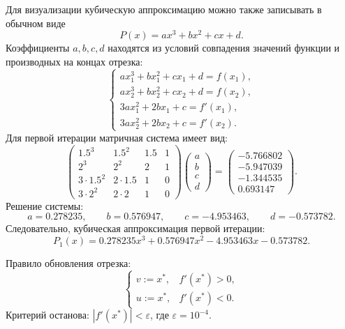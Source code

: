 \documentclass[12pt,a4paper]{article}
\begin{document}
Для визуализации кубическую аппроксимацию можно также записывать в обычном виде
\begin{equation}
  P(x)=ax^3+bx^2+cx+d.
\end{equation}
Коэффициенты $a,b,c,d$ находятся из условий совпадения значений функции и производных на концах отрезка:
\begin{equation}
\begin{cases}
  ax_1^3+bx_1^2+cx_1+d=f(x_1),\\
  ax_2^3+bx_2^2+cx_2+d=f(x_2),\\
  3ax_1^2+2bx_1+c=f'(x_1),\\
  3ax_2^2+2bx_2+c=f'(x_2).
\end{cases}
\end{equation}
Для первой итерации матричная система имеет вид:
\begin{equation}
\begin{pmatrix}
1.5^3 & 1.5^2 & 1.5 & 1\\
2^3 & 2^2 & 2 & 1\\
3\cdot 1.5^2 & 2\cdot 1.5 & 1 & 0\\
3\cdot 2^2 & 2\cdot 2 & 1 & 0
\end{pmatrix}
\begin{pmatrix}
a\\b\\c\\d
\end{pmatrix}
=
\begin{pmatrix}
-5.766802\\
-5.947039\\
-1.344535\\
0.693147
\end{pmatrix}.
\end{equation}
Решение системы:
\begin{equation}
  a=0.278235,\qquad b=0.576947,\qquad c=-4.953463,\qquad d=-0.573782.
\end{equation}
Следовательно, кубическая аппроксимация первой итерации:
\begin{equation}
  P_1(x)=0.278235x^3+0.576947x^2-4.953463x-0.573782.
\end{equation}

Правило обновления отрезка:
\begin{equation}
  \begin{cases}
    v := x^*, & f'(x^*)>0,\\
    u := x^*, & f'(x^*)<0.
  \end{cases}
\end{equation}
Критерий останова: $|f'(x^*)|<\varepsilon$, где $\varepsilon=10^{-4}$.
\end{document}
